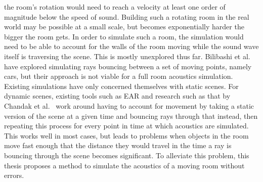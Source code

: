 the room's rotation would need to reach a velocity at least one order of magnitude below the speed of sound.
Building such a rotating room in the real world may be possible at a small scale,
but becomes exponentially harder the bigger the room gets.
\newline
In order to simulate such a room, the simulation would need to be able to account for
the walls of the room moving while the sound wave itself is traversing the scene.
This is mostly unexplored thus far.
Bilibashi et al.~\cite{BVD20} have explored simulating rays bouncing between a set of moving points, namely cars,
but their approach is not viable for a full room acoustics simulation.
\newline
Existing simulations have only concerned themselves with static scenes.
For dynamic scenes, existing tools such as EAR and research such as that by Chandak et al.~\cite{Cha08}
work around having to account for movement by taking a static version of the scene at a given time
and bouncing rays through that instead,
then repeating this process for every point in time at which acoustics are simulated.
\newline
This works well in most cases, but leads to problems when objects in the room move fast enough
that the distance they would travel in the time a ray is bouncing through the scene becomes significant.
To alleviate this problem, this thesis proposes a method to simulate the acoustics of a moving room without errors.


